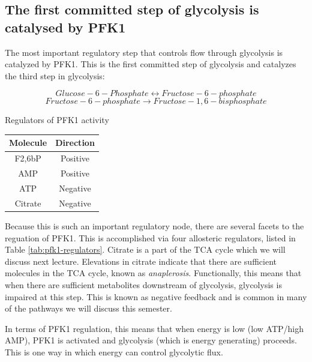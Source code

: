 \documentclass{tufte-handout}
\begin{document}
\subsection{The first committed step of glycolysis is catalysed by PFK1}

The most important regulatory step that controls flow through glycolysis is catalyzed by PFK1.  This is the first committed step of glycolysis and catalyzes the third step in glycolysis:

\begin{equation}
Glucose-6-Phosphate \leftrightarrow Fructose-6-phosphate
\end{equation}
\begin{equation}
Fructose-6-phosphate \rightarrow Fructose-1,6-bisphosphate
\end{equation}

\begin{margintable}
\centering
\caption{Regulators of PFK1 activity}
\label{tab:pfk1-regulators}
\begin{tabular}{cc}
\hline
\textbf {Molecule} & \textbf{Direction}  \\
\hline
F2,6bP & Positive \\
AMP & Positive \\
ATP & Negative \\
Citrate & Negative \\
\hline
\end{tabular}
\end{margintable}

Because this is such an important regulatory node, there are several facets to the reguation of PFK1.  This is accomplished via four allosteric regulators, listed in Table \ref{tab:pfk1-regulators}.  Citrate is a part of the TCA cycle which we will discuss next lecture.  Elevations in citrate indicate that there are sufficient molecules in the TCA cycle, known as \emph{anaplerosis}.  Functionally, this means that when there are sufficient metabolites downstream of glycolysis, glycolysis is impaired at this step.  This is known as negative feedback and is common in many of the pathways we will discuss this semester.

  In terms of PFK1 regulation, this means that when energy is low (low ATP/high AMP), PFK1 is activated and glycolysis (which is energy generating) proceeds.  This is one way in which energy can control glycolytic flux.
\end{document}
